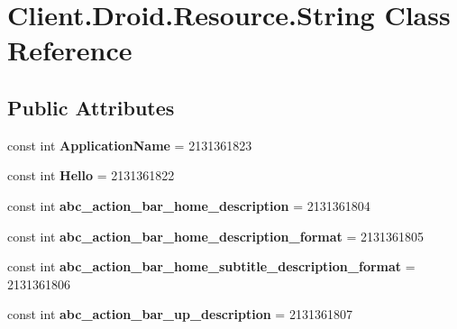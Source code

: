 \hypertarget{classClient_1_1Droid_1_1Resource_1_1String}{}\section{Client.\+Droid.\+Resource.\+String Class Reference}
\label{classClient_1_1Droid_1_1Resource_1_1String}
\subsection*{Public Attributes}
\begin{DoxyCompactItemize}
\item 
\hypertarget{classClient_1_1Droid_1_1Resource_1_1String_ae2f3076955b68b8062cc6628826f2fe6}{}const int {\bfseries Application\+Name} = 2131361823\label{classClient_1_1Droid_1_1Resource_1_1String_ae2f3076955b68b8062cc6628826f2fe6}

\item 
\hypertarget{classClient_1_1Droid_1_1Resource_1_1String_afeddcb75d0480eec80976410cd7edd82}{}const int {\bfseries Hello} = 2131361822\label{classClient_1_1Droid_1_1Resource_1_1String_afeddcb75d0480eec80976410cd7edd82}

\item 
\hypertarget{classClient_1_1Droid_1_1Resource_1_1String_a636b07efe5c85b4afd294026b2d95716}{}const int {\bfseries abc\+\_\+action\+\_\+bar\+\_\+home\+\_\+description} = 2131361804\label{classClient_1_1Droid_1_1Resource_1_1String_a636b07efe5c85b4afd294026b2d95716}

\item 
\hypertarget{classClient_1_1Droid_1_1Resource_1_1String_af363f1f952e6bb1a231faf00a4ddb087}{}const int {\bfseries abc\+\_\+action\+\_\+bar\+\_\+home\+\_\+description\+\_\+format} = 2131361805\label{classClient_1_1Droid_1_1Resource_1_1String_af363f1f952e6bb1a231faf00a4ddb087}

\item 
\hypertarget{classClient_1_1Droid_1_1Resource_1_1String_a8fb50edb8bde60ec4993bad9c32c26f2}{}const int {\bfseries abc\+\_\+action\+\_\+bar\+\_\+home\+\_\+subtitle\+\_\+description\+\_\+format} = 2131361806\label{classClient_1_1Droid_1_1Resource_1_1String_a8fb50edb8bde60ec4993bad9c32c26f2}

\item 
\hypertarget{classClient_1_1Droid_1_1Resource_1_1String_abd13123f64be5c070750ae88f82386fc}{}const int {\bfseries abc\+\_\+action\+\_\+bar\+\_\+up\+\_\+description} = 2131361807\label{classClient_1_1Droid_1_1Resource_1_1String_abd13123f64be5c070750ae88f82386fc}


\end{DoxyCompactItemize}
